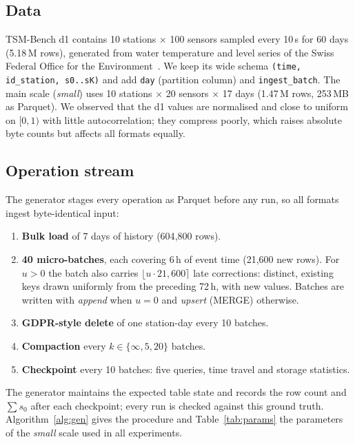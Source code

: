 \documentclass[conference]{IEEEtran}
\begin{document}
\subsection{Data}
TSM-Bench d1 contains 10 stations $\times$ 100 sensors sampled every 10\,s for 60 days (5.18\,M rows), generated from
water temperature and level series of the Swiss Federal Office for the Environment~\cite{khelifati2023tsmbench}.
We keep its wide schema \texttt{(time, id\_station, s0..sK)} and add \texttt{day} (partition column) and
\texttt{ingest\_batch}. The main scale (\emph{small}) uses 10 stations $\times$ 20 sensors $\times$ 17 days
(1.47\,M rows, 253\,MB as Parquet). We observed that the d1 values are normalised and close to uniform on $[0,1)$
with little autocorrelation; they compress poorly, which raises absolute byte counts but affects all formats
equally.

\subsection{Operation stream}
The generator stages every operation as Parquet before any run, so all formats ingest byte-identical input:
\begin{enumerate}
\item \textbf{Bulk load} of 7 days of history (604{,}800 rows).
\item \textbf{40 micro-batches}, each covering 6\,h of event time (21{,}600 new rows). For $u>0$ the batch also
carries $\lfloor u\cdot 21{,}600\rceil$ late corrections: distinct, existing keys drawn uniformly from the preceding
72\,h, with new values. Batches are written with \emph{append} when $u=0$ and \emph{upsert} (MERGE) otherwise.
\item \textbf{GDPR-style delete} of one station-day every 10 batches.
\item \textbf{Compaction} every $k\in\{\infty,5,20\}$ batches.
\item \textbf{Checkpoint} every 10 batches: five queries, time travel and storage statistics.
\end{enumerate}
The generator maintains the expected table state and records the row count and $\sum s_0$ after each checkpoint; every
run is checked against this ground truth. Algorithm~\ref{alg:gen} gives the procedure and Table~\ref{tab:params} the
parameters of the \emph{small} scale used in all experiments.
\end{document}
